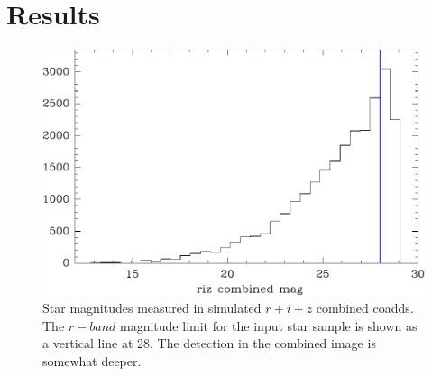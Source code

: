 \documentclass[iop, twocolappendix, appendixfloats, numberedappendix, apj]{hackemulateapj}
\begin{document}
\section{Results}


% 


\begin{figure}
    \includegraphics[width=\columnwidth]{mag-hist.pdf}
    \caption{
        Star magnitudes measured in simulated $r+i+z$ combined coadds.  The
        $r-band$ magnitude limit for the input star sample is shown as a
        vertical line at 28.  The detection in the combined image is
        somewhat deeper.
    }
\end{figure}
\end{document}
